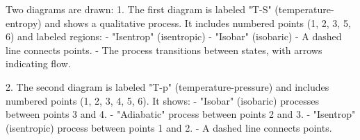 Two diagrams are drawn:  
1. The first diagram is labeled "T-S" (temperature-entropy) and shows a qualitative process. It includes numbered points (1, 2, 3, 5, 6) and labeled regions:  
   - "Isentrop" (isentropic)  
   - "Isobar" (isobaric)  
   - A dashed line connects points.  
   - The process transitions between states, with arrows indicating flow.  

2. The second diagram is labeled "T-p" (temperature-pressure) and includes numbered points (1, 2, 3, 4, 5, 6). It shows:  
   - "Isobar" (isobaric) processes between points 3 and 4.  
   - "Adiabatic" process between points 2 and 3.  
   - "Isentrop" (isentropic) process between points 1 and 2.  
   - A dashed line connects points.